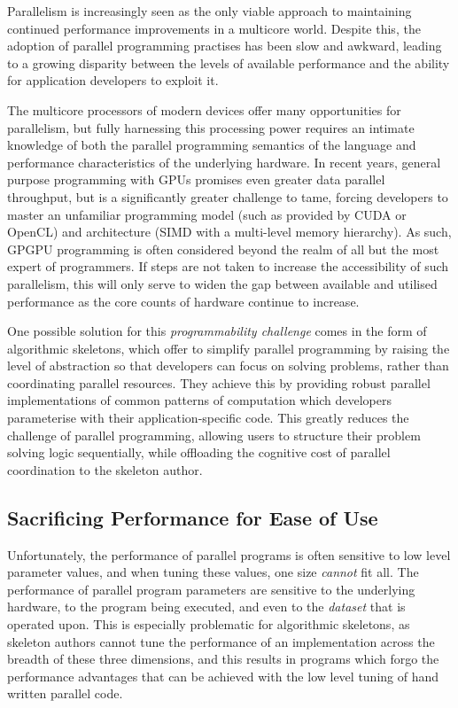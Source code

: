 \documentclass[nonatbib,preprint,9pt]{sigplanconf}
\begin{document}
Parallelism is increasingly seen as the only viable approach to
maintaining continued performance improvements in a multicore world.
Despite this, the adoption of parallel programming practises has been
slow and awkward, leading to a growing disparity between the levels of
available performance and the ability for application developers to
exploit it.

The multicore processors of modern devices offer many opportunities
for parallelism, but fully harnessing this processing power requires
an intimate knowledge of both the parallel programming semantics of
the language and performance characteristics of the underlying
hardware. In recent years, general purpose programming with GPUs
promises even greater data parallel throughput, but is a significantly
greater challenge to tame, forcing developers to master an unfamiliar
programming model (such as provided by CUDA or OpenCL) and
architecture (SIMD with a multi-level memory hierarchy). As such,
GPGPU programming is often considered beyond the realm of all but the
most expert of programmers. If steps are not taken to increase the
accessibility of such parallelism, this will only serve to widen the
gap between available and utilised performance as the core counts of
hardware continue to increase.

One possible solution for this \emph{programmability challenge} comes
in the form of algorithmic skeletons, which offer to simplify parallel
programming by raising the level of abstraction so that developers can
focus on solving problems, rather than coordinating parallel
resources. They achieve this by providing robust parallel
implementations of common patterns of computation which developers
parameterise with their application-specific code. This greatly
reduces the challenge of parallel programming, allowing users to
structure their problem solving logic sequentially, while offloading
the cognitive cost of parallel coordination to the skeleton author.


\subsection{Sacrificing Performance for Ease of Use}

Unfortunately, the performance of parallel programs is often sensitive
to low level parameter values, and when tuning these values, one size
\emph{cannot} fit all. The performance of parallel program parameters
are sensitive to the underlying hardware, to the program being
executed, and even to the \emph{dataset} that is operated upon. This
is especially problematic for algorithmic skeletons, as skeleton
authors cannot tune the performance of an implementation across the
breadth of these three dimensions, and this results in programs which
forgo the performance advantages that can be achieved with the low
level tuning of hand written parallel code.
\end{document}

